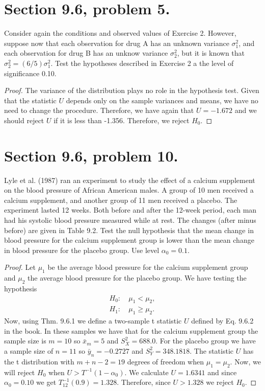 \documentclass{article}
\newenvironment{hwproof}[1]
{
    #1
    \begin{proof}
}{
    \end{proof}
}
\begin{document}
\section{Section 9.6, problem 5.}
\begin{hwproof}
    {
        Consider again the conditions and observed values of Exercise 2. However,
        suppose now that each observation for drug A has an unknown variance
        $\sigma_1^2$, and each observation for drug B has an unknow variance
        $\sigma_2^2$, but it is known that $\sigma_2^2 = (6/5)\sigma_1^2$. Test the
        hypotheses described in Exercise 2 a the level of significance 0.10.
    }
    The variance of the distribution plays no role in the hypothesis test. Given that the
    statistic $U$ depends only on the sample variances and means, we have no need
    to change the procedure. Therefore, we have again that $U = -1.672$ and
    we should reject $U$ if it is less than -1.356. Therefore, we reject $H_0$.
\end{hwproof}

\section{Section 9.6, problem 10.}
\begin{hwproof}
    {
        Lyle et al. (1987) ran an experiment to study the effect of a calcium supplement
        on the blood pressure of African American males. A group of 10 men received a
        calcium supplement, and another group of 11 men received a placebo. The
        experiment lasted 12 weeks. Both before and after the 12-week period, each man had
        his systolic blood pressure measured while at rest. The changes (after minus
        before) are given in Table 9.2. Test the null hypothesis that the mean change
        in blood pressure for the calcium supplement group is lower than the mean change
        in blood pressure for the placebo group. Use level $\alpha_0 = 0.1$.
    }
    Let $\mu_1$ be the average blood pressure for the calcium supplement group
    and $\mu_2$ the average blood pressure for the placebo group.
    We have testing the hypothesis
    \begin{align*}
        H_0: & \ \mu_1 < \mu_2,    \\
        H_1: & \ \mu_1 \geq \mu_2.
    \end{align*}
    Now, using Thm. 9.6.1 we define a two-sample t statistic $U$ defined by
    Eq. 9.6.2 in the book. In these samples we have that for the calcium supplement group
    the sample size is $m = 10$ so $\bar{x}_m = 5$ and $S_X^2 = 688.0$.
    For the placebo group we have a sample size of $n=11$ so $\bar{y}_n = -0.2727$ and
    $S_Y^2 = 348.1818$. The
    statistic $U$ has the t distribution with $m + n -2 = 19$ degrees of freedom
    when $\mu_1 = \mu_2$. Now, we will reject $H_0$ when $U > T^{-1}(1 - \alpha_0)$.
    We calculate $U = 1.6341$ and since $\alpha_0 = 0.10$ we get
    $T_{12}^{-1}(0.9) = 1.328$. Therefore, since $U > 1.328$ we reject $H_0$.
\end{hwproof}
\end{document}
